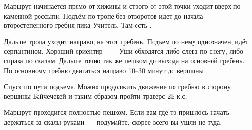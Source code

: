 Маршрут начинается прямо от хижины \geoLighthouse{} и строго от этой
точки уходит вверх по каменной россыпи. Подъём по тропе без отворотов
идет до начала второстепенного гребня пика Учитель. Там есть
.

Дальше тропа уходит направо, на этот гребень. Подъем по нему
однозначен, идёт серпантином. Хороший ориентир~--- \geoUchitelUshi{}.
Уши обходятся либо слева по снегу, либо справа по скалам. Дальше точно
так же пешком до выхода на основной гребень. По основному гребню
двигаться направо 10--30 минут до вершины \geoPeakUchitel{}.

Спуск по пути подъема. Можно продолжить движение по гребню в сторону
вершины Байчечекей и таким образом пройти траверс 2Б к.с.

Маршрут проходится полностью пешком. Если вам где-то пришлось начать
держаться за скалы руками~--- подумайте, скорее всего вы ушли не туда.
